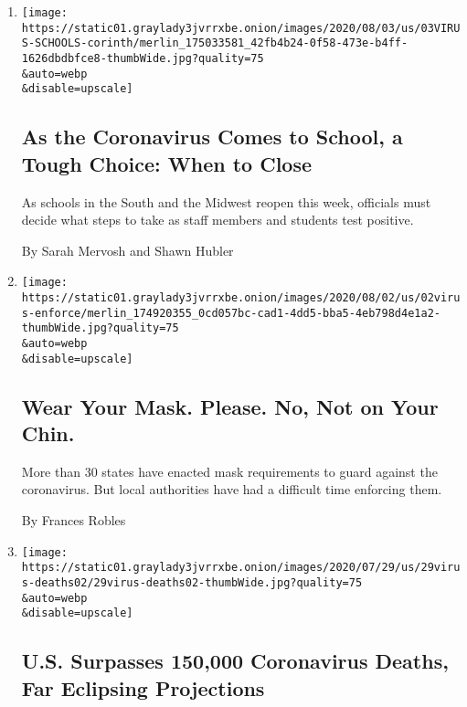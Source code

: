 \begin{enumerate}
\def\labelenumi{\arabic{enumi}.}
\item
  \href{/2020/08/03/us/school-closing-coronavirus.html}{}

  \texttt{[image: https://static01.graylady3jvrrxbe.onion/images/2020/08/03/us/03VIRUS-SCHOOLS-corinth/merlin\_175033581\_42fb4b24-0f58-473e-b4ff-1626dbdbfce8-thumbWide.jpg?quality=75\\\&auto=webp\\\&disable=upscale]}

  \hypertarget{as-the-coronavirus-comes-to-school-a-tough-choice-when-to-close}{%
  \subsection{As the Coronavirus Comes to School, a Tough Choice: When
  to
  Close}\label{as-the-coronavirus-comes-to-school-a-tough-choice-when-to-close}}

  As schools in the South and the Midwest reopen this week, officials
  must decide what steps to take as staff members and students test
  positive.

  By Sarah Mervosh and Shawn Hubler
\item
  \href{/2020/07/31/us/coronavirus-masks-enforcement-key-west.html}{}

  \texttt{[image: https://static01.graylady3jvrrxbe.onion/images/2020/08/02/us/02virus-enforce/merlin\_174920355\_0cd057bc-cad1-4dd5-bba5-4eb798d4e1a2-thumbWide.jpg?quality=75\\\&auto=webp\\\&disable=upscale]}

  \hypertarget{wear-your-mask-please-no-not-on-your-chin}{%
  \subsection{Wear Your Mask. Please. No, Not on Your
  Chin.}\label{wear-your-mask-please-no-not-on-your-chin}}

  More than 30 states have enacted mask requirements to guard against
  the coronavirus. But local authorities have had a difficult time
  enforcing them.

  By Frances Robles
\item
  \href{/2020/07/29/us/coronavirus-deaths-150000.html}{}

  \texttt{[image: https://static01.graylady3jvrrxbe.onion/images/2020/07/29/us/29virus-deaths02/29virus-deaths02-thumbWide.jpg?quality=75\\\&auto=webp\\\&disable=upscale]}

  \hypertarget{us-surpasses-150000-coronavirus-deaths-far-eclipsing-projections}{%
  \subsection{U.S. Surpasses 150,000 Coronavirus Deaths, Far Eclipsing
  Projections}\label{us-surpasses-150000-coronavirus-deaths-far-eclipsing-projections}}


\end{enumerate}
